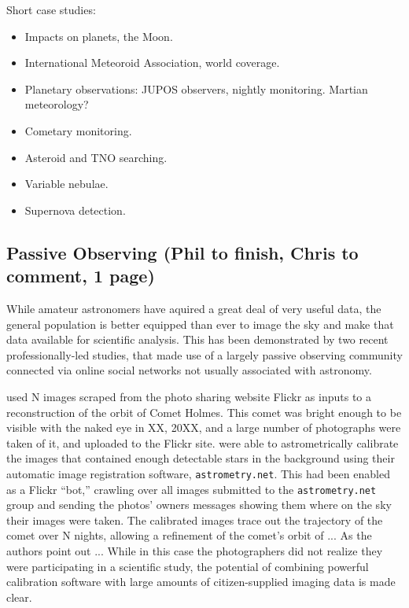 \documentclass{ar2e}
\begin{document}

Short case studies:
\begin{itemize}
\item Impacts on planets, the Moon. 
\item International Meteoroid Association, world coverage.
\item Planetary observations: JUPOS observers, nightly monitoring. 
        Martian meteorology?
\item Cometary monitoring.
\item Asteroid and TNO searching.
\item Variable nebulae.
\item Supernova detection.
\end{itemize}

% 
% 



\subsection{Passive Observing (Phil to finish, Chris to comment, 1 page)}
\label{sec:obs:passive}

While amateur astronomers have aquired a great deal of very useful data, the
general population is better equipped than ever to image the sky and make that
data available for scientific analysis. This has been demonstrated by two
recent professionally-led studies, that made use of a largely passive
observing community connected via online social networks not usually
associated with astronomy. 

\citet{Lang++2011} used N images scraped from the photo sharing website Flickr
as inputs to a reconstruction of the orbit of Comet Holmes. This comet was
bright enough to be visible with the naked eye in XX, 20XX, and a large number
of photographs were taken of it, and uploaded to the Flickr site.
\citeauthor{Lang++2011} were able to astrometrically calibrate the images that
contained enough detectable stars in the background using their automatic
image registration software, \texttt{astrometry.net}. This had been enabled as
a Flickr ``bot,'' crawling over all images submitted to the
\texttt{astrometry.net} group and sending the photos' owners messages showing
them where on the sky their images were taken. The calibrated images trace out
the trajectory of the comet over N nights, allowing a refinement of the
comet's orbit of ... As the authors point out ...  While in this case the
photographers did not realize they were participating in a scientific study,
the potential of combining powerful calibration software with large amounts of
citizen-supplied imaging data is made clear. 
\end{document}
